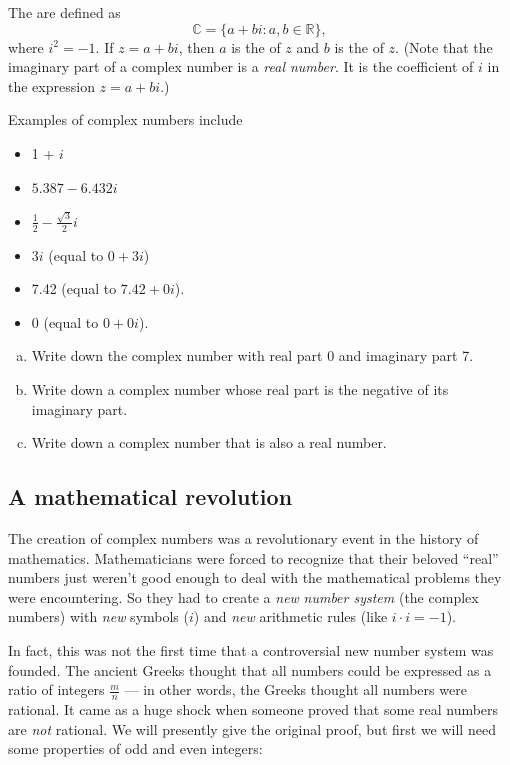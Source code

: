 \begin{defn}
The  are defined
as 
\[
{\mathbb{C}}=\{a+bi:a,b\in{\mathbb{R}}\},\]
 where $i^{2}=-1$. If $z=a+bi$, then $a$ is the  of $z$ and $b$ is the  of $z$. (Note that the imaginary part of a complex number is a \emph{real number}. It is the coefficient of $i$ in the expression $z = a + bi$.)
\end{defn}

\bigskip

 Examples of complex numbers include 
\begin{itemize}
\item 1 + $i$ 
\item $5.387-6.432i$ 
\item $\frac{1}{2}-\frac{\sqrt{3}}{2}i$ 
\item $3i$ (equal to $0+3i$) 
\item 7.42 (equal to $7.42+0i$).
\item 0 (equal to $0+0i$).
\end{itemize}
\begin{exercise}{1}
\begin{enumerate}[(a)]
\item
Write down the complex number with real part 0 and imaginary part 7.
\item
Write down a complex number whose real part is the negative of its imaginary part.
\item
Write down a complex number that is also a real number.
\end{enumerate}
\end{exercise}

\subsection{A mathematical revolution}

The creation of complex numbers was a revolutionary event in
the history of mathematics. Mathematicians were forced to recognize
that their beloved ``real'' numbers just weren't good enough to
deal with the mathematical problems they were encountering. So they
had to create a \emph{new} \emph{number system} (the complex numbers)
with\emph{ new} symbols ($i$) and \emph{new} arithmetic rules
(like $i\cdot i=-1$).

In fact, this was not the first time that a controversial new number
system was founded. The ancient Greeks thought that all numbers could
be expressed as a ratio of integers $\frac{m}{n}$ --- in other words, the Greeks thought all numbers were rational.  It came as a huge
shock when someone proved that some real numbers are \emph{not} rational. We will presently give the original proof, but first we will need some properties of odd and even integers:

